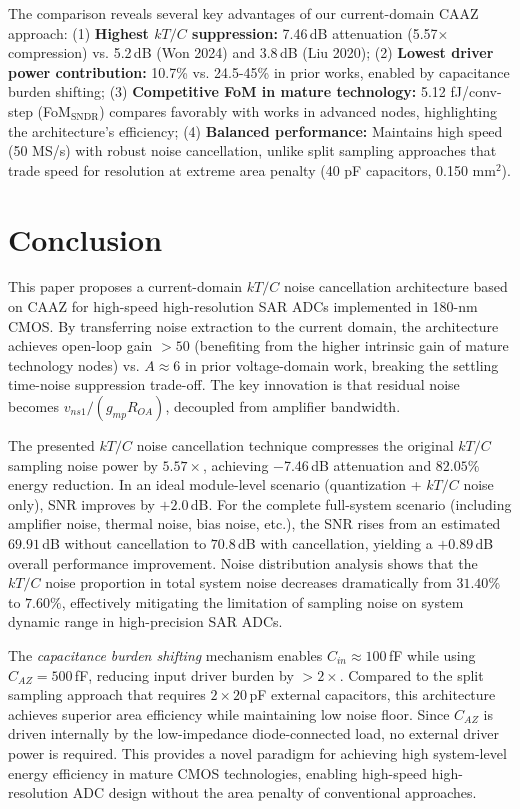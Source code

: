 \documentclass[journal]{IEEEtran}
\begin{document}
\vspace{-0.5em}

The comparison reveals several key advantages of our current-domain CAAZ approach: (1) \textbf{Highest $kT/C$ suppression:} 7.46\,dB attenuation (5.57$\times$ compression) vs. 5.2\,dB (Won 2024) and 3.8\,dB (Liu 2020); (2) \textbf{Lowest driver power contribution:} 10.7\% vs. 24.5-45\% in prior works, enabled by capacitance burden shifting; (3) \textbf{Competitive FoM in mature technology:} 5.12 fJ/conv-step (FoM$_{\text{SNDR}}$) compares favorably with works in advanced nodes, highlighting the architecture's efficiency; (4) \textbf{Balanced performance:} Maintains high speed (50 MS/s) with robust noise cancellation, unlike split sampling approaches that trade speed for resolution at extreme area penalty (40 pF capacitors, 0.150 mm$^2$).

\section{Conclusion}
This paper proposes a current-domain $kT/C$ noise cancellation architecture based on CAAZ for high-speed high-resolution SAR ADCs implemented in 180-nm CMOS. By transferring noise extraction to the current domain, the architecture achieves open-loop gain $>50$ (benefiting from the higher intrinsic gain of mature technology nodes) vs. $A \approx 6$ in prior voltage-domain work, breaking the settling time-noise suppression trade-off. The key innovation is that residual noise becomes $v_{ns1}/(g_{mp}R_{OA})$, decoupled from amplifier bandwidth.

The presented $kT/C$ noise cancellation technique compresses the original $kT/C$ sampling noise power by $5.57\times$, achieving $-$7.46\,dB attenuation and $82.05\%$ energy reduction. In an ideal module-level scenario (quantization + $kT/C$ noise only), SNR improves by $+2.0$\,dB. For the complete full-system scenario (including amplifier noise, thermal noise, bias noise, etc.), the SNR rises from an estimated $69.91$\,dB without cancellation to $70.8$\,dB with cancellation, yielding a $+0.89$\,dB overall performance improvement. Noise distribution analysis shows that the $kT/C$ noise proportion in total system noise decreases dramatically from $31.40\%$ to $7.60\%$, effectively mitigating the limitation of sampling noise on system dynamic range in high-precision SAR ADCs.

The \textit{capacitance burden shifting} mechanism enables $C_{in} \approx 100$\,fF while using $C_{AZ} = 500$\,fF, reducing input driver burden by $>2\times$. Compared to the split sampling approach that requires $2\times 20$\,pF external capacitors, this architecture achieves superior area efficiency while maintaining low noise floor. Since $C_{AZ}$ is driven internally by the low-impedance diode-connected load, no external driver power is required. This provides a novel paradigm for achieving high system-level energy efficiency in mature CMOS technologies, enabling high-speed high-resolution ADC design without the area penalty of conventional approaches.
\end{document}
